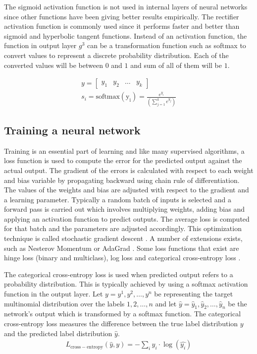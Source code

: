 \documentclass[a4paper, 11pt]{article}
\begin{document}
The sigmoid activation function is not used in internal layers of neural networks since other functions have been giving better results empirically. The rectifier activation function is commonly used since it performs faster and better than sigmoid and hyperbolic tangent functions. Instead of an activation function, the function in output layer $g^3$ can be a transformation function such as softmax to convert values to represent a discrete probability distribution. Each of the converted values will be between $0$ and $1$ and sum of all of them will be $1$.

\begin{align*}
y = \begin{bmatrix} y_1 & y_2 & \dots & y_k \end{bmatrix} \\
s_i = \mathrm{softmax(y_i)} = \frac{e^{y_i}}{(\sum_{j=1}^ke^{y_j})}
\end{align*}

\subsection{Training a neural network}

Training is an essential part of learning and like many supervised algorithms, a loss function is used to compute the error for the predicted output against the actual output. The gradient of the errors is calculated with respect to each weight and bias variable by propagating backward using chain rule of differentiation. The values of the weights and bias are adjusted with respect to the gradient and a learning parameter. Typically a random batch of inputs is selected and a forward pass is carried out which involves multiplying weights, adding bias and applying an activation function to predict outputs. The average loss is computed for that batch and the parameters are adjusted accordingly. This optimization technique is called stochastic gradient descent \parencite{Bottou2012}. A number of extensions exists, such as Nesterov Momentum \parencite{Sutskever2013} or AdaGrad \parencite{Duchi2011}. Some loss functions that exist are hinge loss (binary and multiclass), log loss and categorical cross-entropy loss \parencite{Goldberg2016}. 


The categorical cross-entropy loss is used when predicted output refers to a probability distribution. This is typically achieved by using a softmax activation function in the output layer. Let $y = y^{1}, y^{2}, \dots, y^{n}$ be representing the target multinomial distribution over the labels $1,2,\dots,n$ and let $ \hat{y} = \hat{y}_{1},\hat{y}_{2},\dots,\hat{y}_{n}$ be the network's output which is transformed by a softmax function. The categorical cross-entropy loss measures the difference between the true label distribution $y$ and the predicted label distribution $\hat{y}$. 
\begin{align*}
L_\mathrm{cross-entropy}(\hat{y},y) = -\sum_iy_i \cdot \log(\hat{y_i})
\end{align*}
\end{document}
